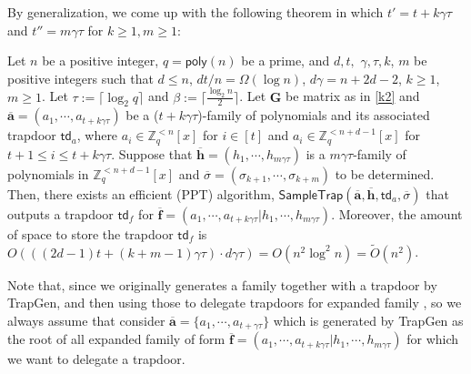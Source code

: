 \documentclass[runningheads]{llncs}
\begin{document}
    
     By generalization, we come up with the following theorem in which $t'=t+k\gamma\tau$ and $t''=m\gamma\tau$ for $k \geq 1, m\geq 1$:
\begin{theorem} \label{multiple}
Let $n$  be a positive integer, $q=\textsf{poly}(n)$ be a prime, and $d, t,$ $ \gamma, \tau, k$, $m$ be positive integers such that $d \leq n$, $dt/n =\Omega(\log n)$, $ d\gamma=n+2d-2$, $k\geq 1$, $m \geq 1$. Let $\tau:=\lceil \log_2 q \rceil$ and  $\beta:=\lceil \frac{\log_2 n}{2} \rceil$.	Let $\mathbf{G}$ be matrix as in \eqref{k2} and $\overline{\mathbf{a}}=(a_1,\cdots,a_{t+k\gamma \tau})$ be a ($t+k\gamma \tau$)-family of polynomials and its associated trapdoor $\mathsf{td}_a$, where $a_i \in \mathbb{Z}^{<n}_q[x] $ for $i \in [t]$ and $a_i \in \mathbb{Z}^{<n+d-1}_q[x] $ for $t+1\leq i \leq t+k\gamma \tau$. Suppose that $\overline{\mathbf{h}}=(h_1,\cdots, h_{m\gamma \tau})$ is a $m\gamma \tau$-family of polynomials in $\mathbb{Z}^{<n+d-1}_q[x]$ and $\overline{\sigma}=(\sigma_{k+1}, \cdots, \sigma_{k+m}) $ to be determined. Then, there exists an efficient (PPT) algorithm,  $\mathsf{SampleTrap}(\overline{\mathbf{a}},\overline{\mathbf{h}},\mathsf{td}_a,\overline{\sigma})$ that outputs a trapdoor $\mathsf{td}_f$ for $\overline{\mathbf{f}}=(a_1,\cdots,a_{t+k\gamma \tau}| h_1,\cdots, h_{m\gamma \tau})$. 
         Moreover, the amount of space to store the trapdoor $\mathsf{td}_f$ is $O(((2d-1)t+(k+m-1)\gamma \tau)\cdot d\gamma \tau)=O(n^2 \log^2 n)=\widetilde{O}(n^2)$.
         \end{theorem}
         
        
      \iffalse  
        \begin{remark} 
        	
        	 Note that, since we originally generates a family together with a trapdoor by TrapGen, and then using those to delegate trapdoors for expanded family , so we always assume that consider $\overline{\mathbf{a}}=\{ a_1, \cdots, a_{t+\gamma\tau} \}$ which is generated by \textsf{TrapGen} as the root of all expanded family of form $\overline{\mathbf{f}}=(a_1,\cdots,a_{t+k\gamma \tau}| h_1,\cdots, h_{m\gamma \tau})$ for which we want to delegate a trapdoor.
        \end{remark}
    
\end{document}
